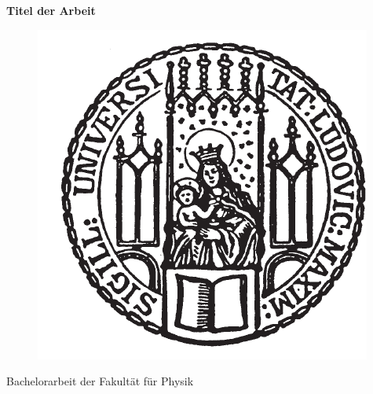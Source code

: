 \documentclass[11pt]{article}
\begin{document}
    \lhead[\fancyplain{}{\thepage}]{\fancyplain{}{\rightmark}}
    \rhead[\fancyplain{}{\leftmark}]{\fancyplain{}{\thepage}}
    \cfoot{}
      \begin{titlepage}
        \begin{center}
            \vspace*{0.65cm}
            \huge
            \hspace*{-0.73cm}
            \textbf{Titel der Arbeit}\\
            \vspace*{2.2cm}

            \begin{figure}[h]
                \begin{center}
                    \hspace*{-0.73cm}
                    \includegraphics{lmu_siegel}
                \end{center}\label{fig:lmulogo}
            \end{figure}
            \vspace*{0.5cm}
            \Large
            \hspace*{-0.73cm}
            \hspace*{-0.5cm}Bachelorarbeit der Fakult\"at f\"ur Physik\\
            \vspace*{0.1cm}

\end{center}
\end{titlepage}
\end{document}
